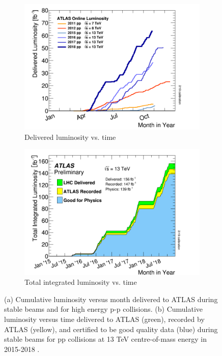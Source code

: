 \documentclass[12pt,a4paper,epsf,portrait,times,epsfig]{article}
\begin{document}
		\begin{figure}
			\begin{subfigure}{.49\textwidth}
				\centering
				\includegraphics[scale=0.27]{ATLAS_Luminosity_Time.png}
				\caption{Delivered luminosity vs. time}
				\label{Fig:SFigATLASLuminosityTime}
			\end{subfigure}
			\begin{subfigure}{.49\textwidth}
				\centering
				\includegraphics[scale=0.27]{ATLAS_Luminosity_Total.png}
				\caption{Total integrated luminosity vs. time}
				\label{Fig:SFigATLASLuminosityTotal}
			\end{subfigure}
			\caption{ (a) Cumulative luminosity versus month delivered to ATLAS during stable beams and for high energy p-p collisions. (b) Cumulative luminosity versus time delivered to ATLAS (green), recorded by ATLAS (yellow), and certified to be good quality data (blue) during stable beams for pp collisions at 13 TeV centre-of-mass energy in 2015-2018 \cite{ATLASLumiPublic}.}
			\label{Fig:ATLASLuminosity}
		\end{figure}
\end{document}
